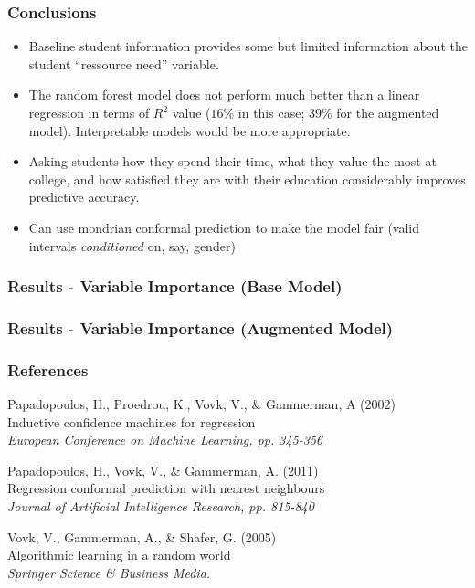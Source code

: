 \documentclass{beamer}
\begin{document}
\begin{frame} \frametitle{Conclusions}

\begin{itemize}
	\item Baseline student information provides some but limited information about the student ``ressource need'' variable.
	\item The random forest model does not perform much better than a linear regression in terms of $R^2$ value ($16\%$ in this case; $39\%$ for the augmented model). Interpretable models would be more appropriate.
	\item Asking students how they spend their time, what they value the most at college, and how satisfied they are with their education considerably improves predictive accuracy.
	\item Can use mondrian conformal prediction to make the model fair (valid intervals \textit{conditioned} on, say, gender)
\end{itemize}


\end{frame}


\begin{frame} \frametitle{Results - Variable Importance (Base Model)}    

\end{frame}


\begin{frame} \frametitle{Results - Variable Importance (Augmented Model)}    

\end{frame}




\begin{frame}
\frametitle{References}
\footnotesize{
	\begin{thebibliography}{99} %
				
		 Papadopoulos, H., Proedrou, K., Vovk, V., \& Gammerman, A (2002)\\
		\newblock Inductive confidence machines for regression \\
		\newblock \emph{European Conference on Machine Learning, pp. 345-356}		
		
		 Papadopoulos, H., Vovk, V., \& Gammerman, A. (2011) \\
		\newblock Regression conformal prediction with nearest neighbours \\
		\newblock \emph{Journal of Artificial Intelligence Research, pp. 815-840}		
		
		 Vovk, V., Gammerman, A., \& Shafer, G. (2005) \\
		\newblock Algorithmic learning in a random world \\
		\newblock \emph{Springer Science \& Business Media.}
		
	\end{thebibliography}
}
\end{frame}
    
\end{document}

